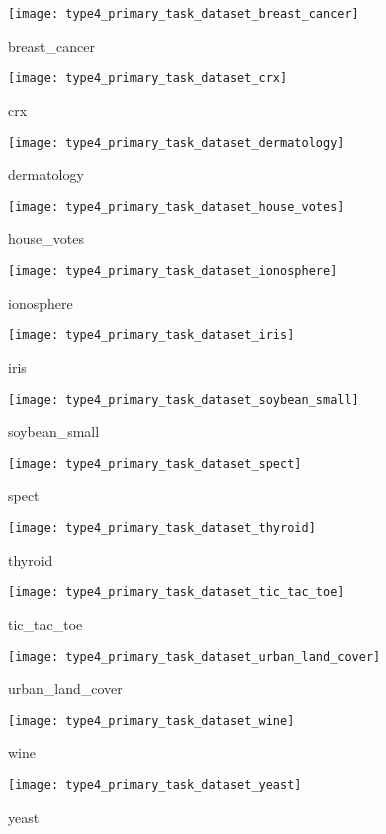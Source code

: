 \begin{figure}[H]\texttt{[image: type4\_primary\_task\_dataset\_breast\_cancer]}\centering\caption{breast\_cancer}\end{figure}
\begin{figure}[H]\texttt{[image: type4\_primary\_task\_dataset\_crx]}\centering\caption{crx}\end{figure}
\begin{figure}[H]\texttt{[image: type4\_primary\_task\_dataset\_dermatology]}\centering\caption{dermatology}\end{figure}
\begin{figure}[H]\texttt{[image: type4\_primary\_task\_dataset\_house\_votes]}\centering\caption{house\_votes}\end{figure}
\begin{figure}[H]\texttt{[image: type4\_primary\_task\_dataset\_ionosphere]}\centering\caption{ionosphere}\end{figure}
\begin{figure}[H]\texttt{[image: type4\_primary\_task\_dataset\_iris]}\centering\caption{iris}\end{figure}
\begin{figure}[H]\texttt{[image: type4\_primary\_task\_dataset\_soybean\_small]}\centering\caption{soybean\_small}\end{figure}
\begin{figure}[H]\texttt{[image: type4\_primary\_task\_dataset\_spect]}\centering\caption{spect}\end{figure}
\begin{figure}[H]\texttt{[image: type4\_primary\_task\_dataset\_thyroid]}\centering\caption{thyroid}\end{figure}
\begin{figure}[H]\texttt{[image: type4\_primary\_task\_dataset\_tic\_tac\_toe]}\centering\caption{tic\_tac\_toe}\end{figure}
\begin{figure}[H]\texttt{[image: type4\_primary\_task\_dataset\_urban\_land\_cover]}\centering\caption{urban\_land\_cover}\end{figure}
\begin{figure}[H]\texttt{[image: type4\_primary\_task\_dataset\_wine]}\centering\caption{wine}\end{figure}
\begin{figure}[H]\texttt{[image: type4\_primary\_task\_dataset\_yeast]}\centering\caption{yeast}\end{figure}

